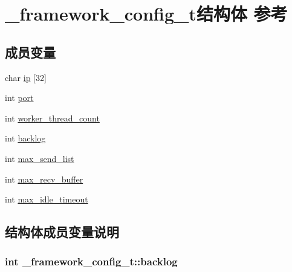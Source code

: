 \hypertarget{a00010}{}\section{\+\_\+framework\+\_\+config\+\_\+t结构体 参考}
\label{a00010}
\subsection*{成员变量}
\begin{DoxyCompactItemize}
\item 
char \hyperlink{a00010_a8951c98a81e521c3484a9379187a71ae_a8951c98a81e521c3484a9379187a71ae}{ip} \mbox{[}32\mbox{]}
\item 
int \hyperlink{a00010_af6fc4d28729e9781be207328cb0f7f39_af6fc4d28729e9781be207328cb0f7f39}{port}
\item 
int \hyperlink{a00010_a9a064afbac56ea11a4ec150bb4df152e_a9a064afbac56ea11a4ec150bb4df152e}{worker\+\_\+thread\+\_\+count}
\item 
int \hyperlink{a00010_a8ee0507b64f0344b46c71885a8426e39_a8ee0507b64f0344b46c71885a8426e39}{backlog}
\item 
int \hyperlink{a00010_abb82119b4ba305caeb440420a3ecc2a0_abb82119b4ba305caeb440420a3ecc2a0}{max\+\_\+send\+\_\+list}
\item 
int \hyperlink{a00010_aca1aa78280c1834c83144231f806be90_aca1aa78280c1834c83144231f806be90}{max\+\_\+recv\+\_\+buffer}
\item 
int \hyperlink{a00010_a0b86a47f9d0105becae7728615de0aa7_a0b86a47f9d0105becae7728615de0aa7}{max\+\_\+idle\+\_\+timeout}
\end{DoxyCompactItemize}


\subsection{结构体成员变量说明}
\hypertarget{a00010_a8ee0507b64f0344b46c71885a8426e39_a8ee0507b64f0344b46c71885a8426e39}{}
\subsubsection[{backlog}]{\setlength{\rightskip}{0pt plus 5cm}int \+\_\+framework\+\_\+config\+\_\+t\+::backlog}\label{a00010_a8ee0507b64f0344b46c71885a8426e39_a8ee0507b64f0344b46c71885a8426e39}
\hypertarget{a00010_a8951c98a81e521c3484a9379187a71ae_a8951c98a81e521c3484a9379187a71ae}{}
